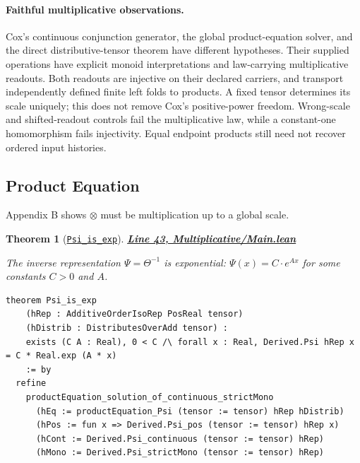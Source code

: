 \documentclass[11pt]{article}
\newtheorem{theorem}{Theorem}[section]
\theoremstyle{definition}
\theoremstyle{remark}
\begin{document}
\paragraph{Faithful multiplicative observations.}
Cox's continuous conjunction generator, the global product-equation solver,
and the direct distributive-tensor theorem have different hypotheses.
Their supplied operations have explicit monoid interpretations and
law-carrying multiplicative readouts. Both readouts are injective on their
declared carriers, and transport independently defined finite left folds to
products. A fixed tensor determines its scale uniquely; this does not remove
Cox's positive-power freedom. Wrong-scale and shifted-readout controls fail the
multiplicative law, while a constant-one homomorphism fails injectivity.
Equal endpoint products still need not recover ordered input histories.

\subsection{Product Equation}

Appendix B shows $\otimes$ must be multiplication up to a global scale.

\begin{theorem}[\href{https://github.com/zariuq/ks-foundations-of-inference/blob/main/KnuthSkilling/Multiplicative/Main.lean}{\texttt{Psi\_is\_exp}}]
\textbf{\href{https://github.com/zariuq/ks-foundations-of-inference/blob/main/KnuthSkilling/Multiplicative/Main.lean}{Line 43, Multiplicative/Main.lean}}

The inverse representation $\Psi = \Theta^{-1}$ is exponential:
$\Psi(x) = C \cdot e^{Ax}$ for some constants $C > 0$ and $A$.
\end{theorem}

\begin{lstlisting}[caption={Appendix B: $\Psi$ is exponential}]
theorem Psi_is_exp
    (hRep : AdditiveOrderIsoRep PosReal tensor)
    (hDistrib : DistributesOverAdd tensor) :
    exists (C A : Real), 0 < C /\ forall x : Real, Derived.Psi hRep x = C * Real.exp (A * x)
    := by
  refine
    productEquation_solution_of_continuous_strictMono
      (hEq := productEquation_Psi (tensor := tensor) hRep hDistrib)
      (hPos := fun x => Derived.Psi_pos (tensor := tensor) hRep x)
      (hCont := Derived.Psi_continuous (tensor := tensor) hRep)
      (hMono := Derived.Psi_strictMono (tensor := tensor) hRep)
\end{lstlisting}
\end{document}
